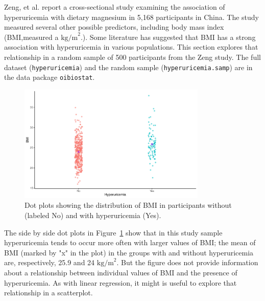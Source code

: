 Zeng, et al. report a cross-sectional study examining the association of hyperuricemia with dietary magnesium in 5,168 participants in China. The study measured several other possible predictors, including body mass index (BMI,measured a $\text{kg/m}^2$.).  Some literature has suggested that BMI has a strong association with hyperuricemia in various populations. This section explores that relationship in a random sample of 500 participants from the Zeng study. The full dataset (\texttt{hyperuricemia}) and the random sample (\texttt{hyperuricemia.samp}) are in the data package \texttt{oibiostat}.

\begin{figure}[h!]
  \centering
  \includegraphics[width=0.80\textwidth]
  {ch_logistic_regression_oi_biostat/figures/bmiHuDotplot/bmiHuDotplot.pdf}
     \caption{Dot plots showing the distribution of BMI in participants without (labeled No) and with hyperuricemia (Yes).}
     \label{figure:bmiHuDotplot}
 \end{figure}

The side by side dot plots in Figure~\ref{figure:bmiHuDotplot} show that in this study sample hyperuricemia tends to occur more often with larger values of BMI; the mean of BMI (marked by "x" in the plot) in the groups with and without hyperuricemia are, respectively, 25.9 and 24 $\text{kg/m}^2$. But the figure does not provide information about a relationship between individual values of BMI and the presence of hyperuricemia.  As with linear regression, it might is useful to explore that relationship in a scatterplot.
         
